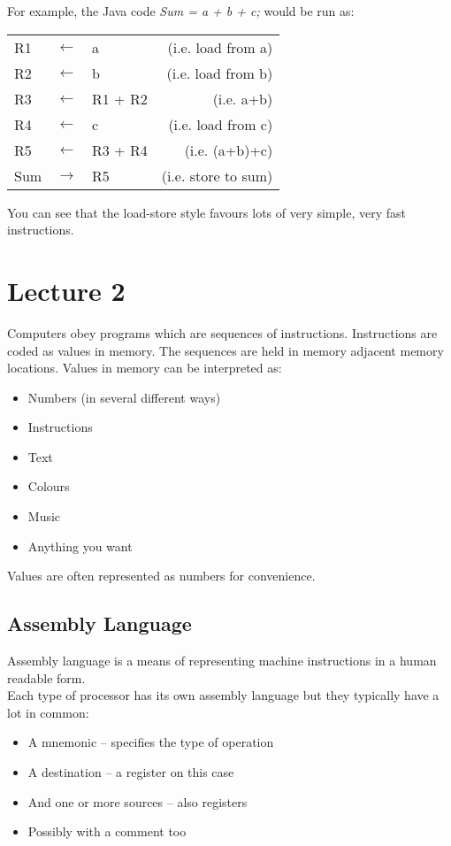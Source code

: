 \documentclass{article} %
\begin{document}
For example, the Java code {\it Sum = a + b + c;} would be run as:

\begin{center}
    \begin{tabular}{l l l r}
        R1 & $\leftarrow$ & a & (i.e. load from a)\\
        R2 & $\leftarrow$ & b & (i.e. load from b)\\
        R3 & $\leftarrow$ & R1 + R2 & (i.e. a+b)\\
        R4 & $\leftarrow$ & c                      & (i.e. load from c)\\
        R5 & $\leftarrow$ & R3 + R4  & (i.e. (a+b)+c)\\
        Sum & $\rightarrow$ & R5 & (i.e. store to sum)\\
    \end{tabular}
\end{center}

You can see that the load-store style favours lots of very simple, very fast instructions.

\section{Lecture 2}
Computers obey programs which are sequences of instructions. Instructions are coded as values in memory. The sequences are held in memory adjacent memory locations. Values in memory can be interpreted as:
\begin{itemize}
	\item Numbers (in several different ways)
	\item Instructions
	\item Text
	\item Colours
	\item Music
	\item Anything you want
\end{itemize}
Values are often represented as numbers for convenience.

\subsection{Assembly Language}
Assembly language is a means of representing machine instructions in a human readable form.\\
Each type of processor has its own assembly language but they typically have a lot in common:
\begin{itemize}
	\item A mnemonic – specifies the type of operation
	\item A destination – a register on this case
	\item And one or more sources – also registers
	\item Possibly with a comment too
\end{itemize}
\end{document}
